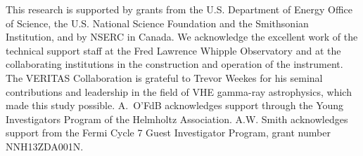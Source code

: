\documentclass[preprint2]{aastex}
\begin{document}
\small{
This research is supported by grants from the U.S. Department of Energy Office of Science, the U.S. National Science Foundation and the Smithsonian Institution, and by NSERC in Canada. We acknowledge the excellent work of the technical support staff at the Fred Lawrence Whipple Observatory and at the collaborating institutions in the construction and operation of the instrument. The VERITAS Collaboration is grateful to Trevor Weekes for his seminal contributions and leadership in the field of VHE gamma-ray astrophysics, which made this study possible. A.\ O'FdB acknowledges support through the Young Investigators Program of the Helmholtz Association. A.W. Smith acknowledges support from the Fermi Cycle 7 Guest Investigator Program, grant number NNH13ZDA001N.
}


\end{document}
